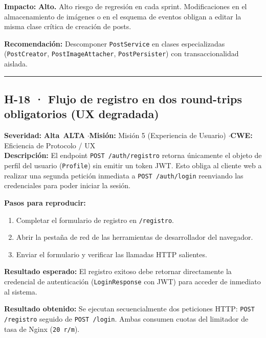 \documentclass[10pt,a4paper]{article}
\newcommand{\code}[1]{\nolinkurl{#1}}
\newcommand{\badgeAlta}{\colorbox{orange!20}{\textcolor{orange!90!black}{\textbf{\footnotesize Alta}}}}
\begin{document}
\noindent\textbf{Impacto:}
\textbf{Alto.} Alto riesgo de regresión en cada sprint. Modificaciones en el almacenamiento de imágenes o en el esquema de eventos obligan a editar la misma clase crítica de creación de posts.

\noindent\textbf{Recomendación:}
Descomponer \code{PostService} en clases especializadas (\code{PostCreator}, \code{PostImageAttacher}, \code{PostPersister}) con transaccionalidad aislada.

\vspace{0.8em}
\hrule
\vspace{0.8em}

\subsection{H-18 · Flujo de registro en dos round-trips obligatorios (UX degradada)}
\noindent\textbf{Severidad:} \badgeAlta\ \textbf{ALTA} \quad$\cdot$\quad \textbf{Misión:} Misión 5 (Experiencia de Usuario) \quad$\cdot$\quad \textbf{CWE:} Eficiencia de Protocolo / UX\\[0.3em]

\noindent\textbf{Descripción:}
El endpoint \code{POST /auth/registro} retorna únicamente el objeto de perfil del usuario (\code{Profile}) sin emitir un token JWT. Esto obliga al cliente web a realizar una segunda petición inmediata a \code{POST /auth/login} reenviando las credenciales para poder iniciar la sesión.

\noindent\textbf{Pasos para reproducir:}
\begin{enumerate}[leftmargin=*]
    \item Completar el formulario de registro en \code{/registro}.
    \item Abrir la pestaña de red de las herramientas de desarrollador del navegador.
    \item Enviar el formulario y verificar las llamadas HTTP salientes.
\end{enumerate}

\noindent\textbf{Resultado esperado:}
El registro exitoso debe retornar directamente la credencial de autenticación (\code{LoginResponse} con JWT) para acceder de inmediato al sistema.

\noindent\textbf{Resultado obtenido:}
Se ejecutan secuencialmente dos peticiones HTTP: \code{POST /registro} seguido de \code{POST /login}. Ambas consumen cuotas del limitador de tasa de Nginx (\code{20 r/m}).
\end{document}
